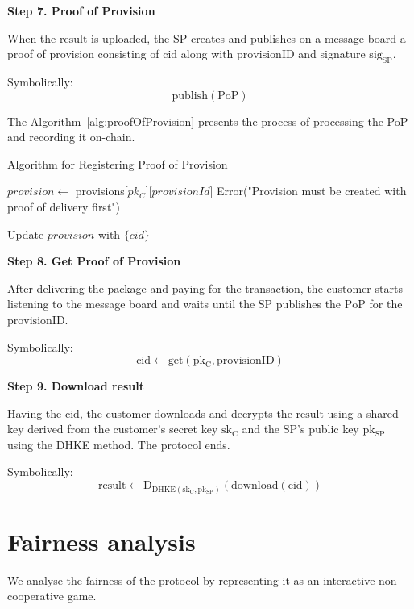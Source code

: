 \documentclass[pdftex,twocolumn,epjc3]{svjour3}
\begin{document}
{\noindent \textbf
{Step 7. Proof of Provision}\label{step-7-proof-of-provision}

When the $\mathrm{result}$ is uploaded, the SP creates and publishes on a message board a proof of provision consisting of $\mathrm{cid}$ along with $\mathrm{provisionID}$ and signature $\mathrm{sig}_\mathrm{SP}$.

Symbolically: 
\[
\mathrm{publish(PoP)}
\]

The Algorithm~\ref{alg:proofOfProvision} presents the process of processing the PoP and recording it on-chain.

\begin{algorithm}
\caption{Algorithm for Registering Proof of Provision}
\label{alg:proofOfProvision}
\begin{algorithmic}[1]
    \State $provision \gets$ provisions[$pk_C$][$provisionId$]
        \State \Return Error("Provision must be created with proof of delivery first")
    \EndIf
    
    \State Update $provision$ with $\{cid\}$
\EndFunction
\end{algorithmic}
\end{algorithm}

\noindent \textbf
{Step 8. Get Proof of Provision}\label{step-8-get-proof-of-provision}

After delivering the package and paying for the transaction, the customer starts listening to the message board and waits until the SP publishes the $\mathrm{PoP}$ for the $\mathrm{provisionID}$.

Symbolically: 
\[
\mathrm{cid \gets get(pk_C, provisionID)}
\]

\noindent \textbf
{Step 9. Download result}\label{step-9-download-result}

Having the $\mathrm{cid}$, the customer downloads and decrypts the $\mathrm{result}$ using a shared key derived from the customer's secret key $\mathrm{sk_C}$ and the SP's public key $\mathrm{pk_{SP}}$ using the DHKE method. The protocol ends.

Symbolically: 
\[
\mathrm{result \gets D_{DHKE(sk_C, pk_{SP})}(download(cid))}
\]

\section{Fairness analysis}\label{sec:fairness-analysis}
We analyse the fairness of the protocol by representing it as an interactive non-cooperative game.

}
\end{document}
